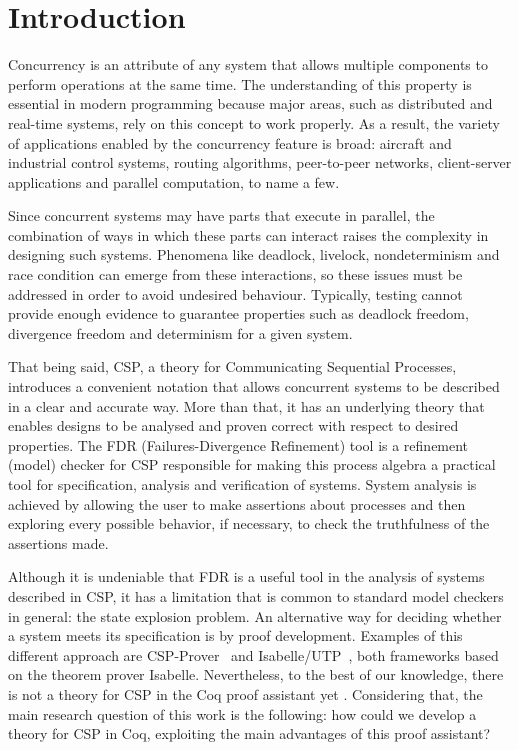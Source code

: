 \chapter{Introduction}

Concurrency is an attribute of any system that allows multiple components to perform operations at the same time. The understanding of this property is essential in modern programming because major areas, such as distributed and real-time systems, rely on this concept to work properly. As a result, the variety of applications enabled by the concurrency feature is broad: aircraft and industrial control systems, routing algorithms, peer-to-peer networks, client-server applications and parallel computation, to name a few.

Since concurrent systems may have parts that execute in parallel, the combination of ways in which these parts can interact raises the complexity in designing such systems. Phenomena like deadlock, livelock, nondeterminism and race condition can emerge from these interactions, so these issues must be addressed in order to avoid undesired behaviour. Typically, testing cannot provide enough evidence to guarantee properties such as deadlock freedom, divergence freedom and determinism for a given system.

That being said, CSP, a theory for Communicating Sequential Processes, introduces a convenient notation that allows concurrent systems to be described in a clear and accurate way. More than that, it has an underlying theory that enables designs to be analysed and proven correct with respect to desired properties. The FDR (Failures-Divergence Refinement) tool is a refinement (model) checker for CSP responsible for making this process algebra a practical tool for specification, analysis and verification of systems. System analysis is achieved by allowing the user to make assertions about processes and then exploring every possible behavior, if necessary, to check the truthfulness of the assertions made.

Although it is undeniable that FDR is a useful tool in the analysis of systems described in CSP, it has a limitation that is common to standard model checkers in general: the state explosion problem. An alternative way for deciding whether a system meets its specification is by proof development. Examples of this different approach are CSP-Prover~\cite{Roggenbach:CSP-Prover} and Isabelle/UTP~\cite{Woodcock:Isabelle/UTP}, both frameworks based on the theorem prover Isabelle. Nevertheless, to the best of our knowledge, there is not a theory for CSP in the Coq proof assistant yet \cite{bertot:coq}. Considering that, the main research question of this work is the following: how could we develop a theory for CSP in Coq, exploiting the main advantages of this proof assistant?

